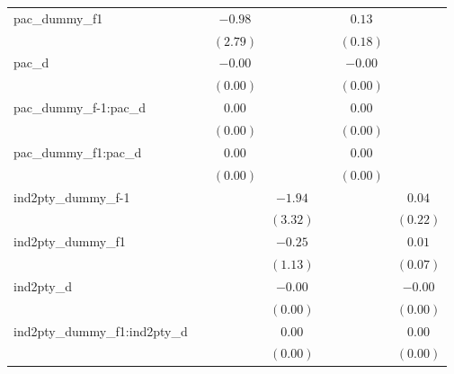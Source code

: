 \documentclass{article}
\begin{document}
\begin{table}
\begin{center}
\begin{tabular}{l c c c c c c }
pac\_dummy\_f1                &              & $-0.98$      &              &              & $0.13$       &              \\
                              &              & $(2.79)$     &              &              & $(0.18)$     &              \\
pac\_d                        &              & $-0.00$      &              &              & $-0.00$      &              \\
                              &              & $(0.00)$     &              &              & $(0.00)$     &              \\
pac\_dummy\_f-1:pac\_d        &              & $0.00$       &              &              & $0.00$       &              \\
                              &              & $(0.00)$     &              &              & $(0.00)$     &              \\
pac\_dummy\_f1:pac\_d         &              & $0.00$       &              &              & $0.00$       &              \\
                              &              & $(0.00)$     &              &              & $(0.00)$     &              \\
ind2pty\_dummy\_f-1           &              &              & $-1.94$      &              &              & $0.04$       \\
                              &              &              & $(3.32)$     &              &              & $(0.22)$     \\
ind2pty\_dummy\_f1            &              &              & $-0.25$      &              &              & $0.01$       \\
                              &              &              & $(1.13)$     &              &              & $(0.07)$     \\
ind2pty\_d                    &              &              & $-0.00$      &              &              & $-0.00$      \\
                              &              &              & $(0.00)$     &              &              & $(0.00)$     \\
ind2pty\_dummy\_f1:ind2pty\_d &              &              & $0.00$       &              &              & $0.00$       \\
                              &              &              & $(0.00)$     &              &              & $(0.00)$     \\

\end{tabular}
\end{center}
\end{table}
\end{document}
